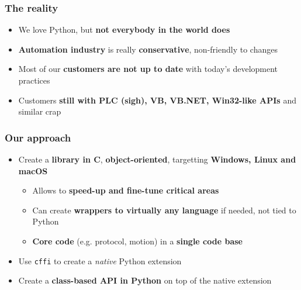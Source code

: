 \documentclass[handout]{beamer}
\begin{document}
\begin{frame}
  \frametitle{The reality}
  \begin{itemize}
    \item<1-> We love Python, but \textbf{not everybody in the world does}
    \item<2-> \textbf{Automation industry} is really \textbf{conservative},
      non-friendly to changes
    \item<3-> Most of our \textbf{customers are not up to date} with today's
      development practices
    \item<4-> Customers \textbf{still with PLC (sigh), VB, VB.NET, Win32-like
      APIs} and similar crap
  \end{itemize}
\end{frame}

\begin{frame}
  \frametitle{Our approach}

  \begin{itemize}
    \item<1-> Create a \textbf{library in C}, \textbf{object-oriented},
      targetting \textbf{Windows, Linux and macOS}
    \begin{itemize}
      \item<2-> Allows to \textbf{speed-up and fine-tune critical areas}
      \item<3-> Can create \textbf{wrappers to virtually any language} if
        needed, not tied to Python
      \item<4-> \textbf{Core code} (e.g. protocol, motion) in a \textbf{single
        code base}
    \end{itemize}
    \item<5-> Use \texttt{cffi} to create a \textit{native} Python extension
    \item<6-> Create a \textbf{class-based API in Python} on top of the native
      extension
  \end{itemize}

\end{frame}
\end{document}
